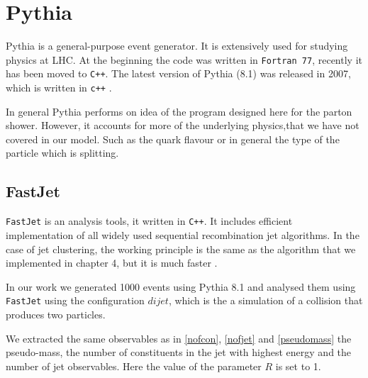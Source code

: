 \chapter{Pythia}
Pythia is a general-purpose event generator. It is extensively used for studying physics at LHC. At the beginning the code was written in \verb+Fortran 77+, recently it has been moved to \verb!C++!. The latest version of Pythia (8.1) was released in 2007, which is written in \verb!c++!  \citep{Buckley:2011ms}.

In general Pythia performs on idea of the program designed here for the parton shower.
However, it accounts for more of the underlying physics,that we have not covered in our model. Such  as the quark flavour or in general the type of the particle which is splitting.  

\section{FastJet} 

\verb+FastJet+ is an analysis tools, it written in \verb!C++!. It includes efficient implementation of all widely used sequential recombination jet algorithms. In the case of jet clustering, the working principle is the same as the algorithm that we implemented in chapter 4,
but it is much faster \citep{Buckley:2011ms}. 

In our work we generated 1000 events using Pythia 8.1 and analysed them using \verb+FastJet+ using the configuration $dijet$, which is the a simulation of a collision that produces two particles. 

We extracted the same  observables as in \ref{nofcon}, \ref{nofjet} and \ref{pseudomass}  the pseudo-mass, the number of constituents in the jet with highest energy and the number of jet observables. Here the value of the parameter $R$ is set to 1.


